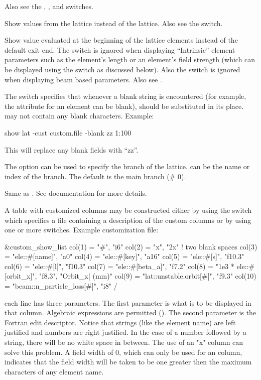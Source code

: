{{{{{{{{\begin{description}
Also see the , , and  switches.
%
\item[-base] \Newline
  Show values from the  lattice instead of the  lattice. Also see the  switch.
%
\item[-beginning] \Newline
Show value evaluated at the beginning of the lattice elements instead of the default exit end.  The
 switch is ignored when displaying ``Intrinsic'' element parameters such as the
element's length or an element's field strength (which can be displayed using the 
switch as discussed below). Also the  switch is ignored when displaying beam based
parameters. Also see .
%
\item[-blank_replacement <string>] \Newline
The  switch specifies that whenever a blank string is encountered (for
example, the  attribute for an element can be blank),  should be substituted
in its place.  may not contain any blank characters. Example:
\begin{example}
  show lat -cust custom.file -blank zz 1:100
\end{example}
This will replace any blank fields with ``zz''.
%
\item[-branch] \Newline
The  option can be used to specify the branch of the lattice.
 can be the name or index of the branch.  The default is the main branch (\# 0).
%
\item[-center] \Newline
Same as . See  documentation for more details.
%
\item[-custom <file_name>] \Newline
A table with customized columns may be constructed either by using the  switch which
specifies a file containing a description of the custom columns or by using one or more
 switches. Example customization file:
\begin{example}
  &custom_show_list
    col(1)  = "#",                      "i6"  
    col(2)  = "x",                      "2x"    ! two blank spaces
    col(3)  = "ele::#[name]",           "a0"  
    col(4)  = "ele::#[key]",            "a16"
    col(5)  = "ele::#[s]",              "f10.3"
    col(6)  = "ele::#[l]",              "f10.3"
    col(7)  = "ele::#[beta_a]",         "f7.2"
    col(8)  = "1e3 * ele::#[orbit_x]",  "f8.3", "Orbit_x| (mm)" 
    col(9)  = "lat::unstable.orbit[#]", "f9.3"
    col(10) = "beam::n_particle_loss[#]", "i8"
  /
\end{example}
each  line has three parameters. The first parameter is what is to be displayed in that
column. Algebraic expressions are permitted (). The second parameter is the
Fortran edit descriptor. Notice that strings (like the element name) are left justified and numbers
are right justified. In the case of a number followed by a string, there will be no white space in
between. The use of an "x" column can solve this problem. A field width of 0, which can only be used
for an  column, indicates that the field width will be taken to be one greater
then the maximum characters of any element name.


\end{description}}}}}}}}}
